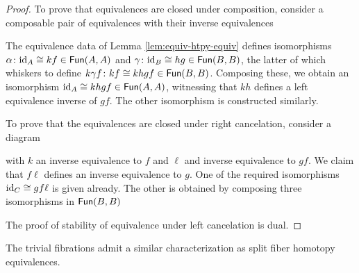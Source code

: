 \begin{proof}
 To prove that equivalences are closed under composition, consider a composable pair of equivalences with their inverse equivalences
\begin{center}
\end{center}
The equivalence data of Lemma \ref{lem:equiv-htpy-equiv} defines isomorphisms $\alpha\colon \textup{id}_A \cong kf \in {\mathord{\mathsf{Fun}}}(A,A)$ and $\gamma \colon \textup{id}_B \cong hg \in {\mathord{\mathsf{Fun}}}(B,B)$, the latter of which whiskers to define $k\gamma f \colon kf \cong khgf \in {\mathord{\mathsf{Fun}}}(B,B)$. Composing these, we obtain an isomorphism $\textup{id}_A \cong khgf \in {\mathord{\mathsf{Fun}}}(A,A)$, witnessing that $kh$ defines a left equivalence inverse of $gf$. The other isomorphism is constructed similarly.

To prove that the equivalences are closed under right cancelation,  consider a diagram
\begin{center}
\end{center}
with $k$ an inverse equivalence to $f$ and $\ell$ and inverse equivalence to $gf$. We claim that $f\ell$ defines an inverse equivalence to $g$. One of the required isomorphisms $\textup{id}_C \cong gf\ell$ is given already. The other is obtained by composing three isomorphisms in ${\mathord{\mathsf{Fun}}}(B,B)$
\begin{center} \end{center}
The proof of stability of equivalence under left cancelation is dual.
\end{proof}


The trivial fibrations admit a similar characterization as split fiber homotopy equivalences.


